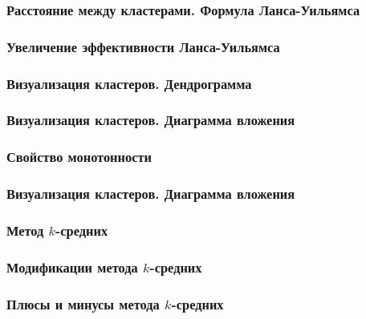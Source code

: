 \documentclass[12pt]{beamer}
\begin{document}
\begin{frame}\frametitle{Расстояние между кластерами. Формула Ланса-Уильямса}
\end{frame}

\begin{frame}\frametitle{Увеличение эффективности Ланса-Уильямса}
\end{frame}

\begin{frame}\frametitle{Визуализация кластеров. Дендрограмма}
\end{frame}

\begin{frame}\frametitle{Визуализация кластеров. Диаграмма вложения}
\end{frame}

\begin{frame}\frametitle{Свойство монотонности}
\end{frame}

\begin{frame}\frametitle{Визуализация кластеров. Диаграмма вложения}
\end{frame}

\begin{frame}\frametitle{Метод $k$-средних}
\end{frame}

\begin{frame}\frametitle{Модификации метода $k$-средних}
\end{frame}

\begin{frame}\frametitle{Плюсы и минусы метода $k$-средних}
\end{frame}

\end{document}
